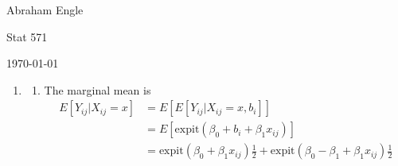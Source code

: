 \documentclass[11pt]{article}
\begin{document}
\pagestyle{empty}
\hfill Abraham Engle

\hfill Stat 571

\hfill \today
\begin{enumerate}
	\item
		\begin{enumerate}
			\item The marginal mean is
			\begin{align*}
				E[Y_{ij}|X_{ij}=x] &= E[E[Y_{ij}|X_{ij}=x,b_i]] \\
				&= E[\mathrm{expit}(\beta_0 + b_i + \beta_1 x_{ij})] \\
				&= \mathrm{expit}(\beta_0 + \beta_1 x_{ij})\frac{1}{2} + \mathrm{expit}(\beta_0 -\beta_1 + \beta_1 x_{ij})\frac{1}{2}
			\end{align*}
			

\end{enumerate}
\end{enumerate}
\end{document}
